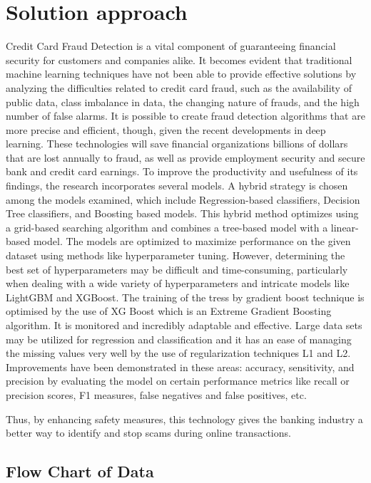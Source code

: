 \section{Solution approach}
\label{sec:intro_sol} %
Credit Card Fraud Detection is a vital component of guaranteeing financial security for customers and companies alike. It becomes evident that traditional machine learning techniques have not been able to provide effective solutions by analyzing the difficulties related to credit card fraud, such as the availability of public data, class imbalance in data, the changing nature of frauds, and the high number of false alarms. It is possible to create fraud detection algorithms that are more precise and efficient, though, given the recent developments in deep learning. These technologies will save financial organizations billions of dollars that are lost annually to fraud, as well as provide employment security and secure bank and credit card earnings. To improve the productivity and usefulness of its findings, the research incorporates several models. A hybrid strategy is chosen among the models examined, which include Regression-based classifiers, Decision Tree classifiers, and Boosting based models. This hybrid method optimizes using a grid-based searching algorithm and combines a tree-based model with a linear-based model. The models are optimized to maximize performance on the given dataset using methods like hyperparameter tuning. However, determining the best set of hyperparameters may be difficult and time-consuming, particularly when dealing with a wide variety of hyperparameters and intricate models like LightGBM and XGBoost. The training of the tress by gradient boost technique is optimised by the use of XG Boost which is an Extreme Gradient Boosting algorithm. It is monitored and incredibly adaptable and effective. Large data sets may be utilized for regression and classification and it has an ease of managing the missing values very well by the use of regularization techniques L1 and L2. Improvements have been demonstrated in these areas: accuracy, sensitivity, and precision by evaluating the model on certain performance metrics like recall or precision scores, F1 measures, false negatives and false positives, etc. 

Thus, by enhancing safety measures, this technology gives the banking industry a better way to identify and stop scams during online transactions.

 

\subsection{Flow Chart of Data}
\label{sec:intro_some_sub1}


